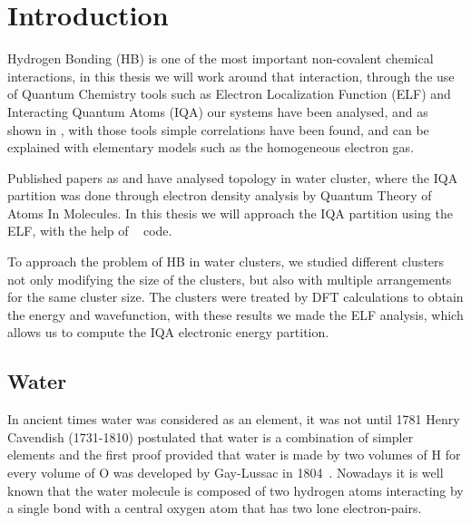 \chapter{Introduction}

Hydrogen Bonding (HB) is one of the most important non-covalent chemical
interactions, in this thesis we will work around that interaction, through the
use of Quantum Chemistry tools such as Electron Localization Function (ELF) and
Interacting Quantum Atoms (IQA) our systems have been analysed, and as shown
in \citet{Munrriz2019}, with those tools simple correlations have been found,
and can be explained with elementary models such as the homogeneous electron
gas.

Published papers as \citet{Toche2016} and \citet{Castor2020} have analysed
topology in water cluster, where the IQA partition was done through electron
density analysis by Quantum Theory of Atoms In Molecules. In this thesis we
will approach the IQA partition using the ELF, with the help of
{}~\cite{promolden} code.

To approach the problem of HB in water clusters, we studied different
clusters not only modifying the size of the clusters, but also with multiple
arrangements for the same cluster size. The clusters were treated by
DFT calculations to obtain the energy and wavefunction, with these
results we made the ELF analysis, which allows us to compute
the IQA electronic energy partition.

%

\newpage
%
\section{Water}

In ancient times water was considered as an element, it was not until 1781
Henry Cavendish (1731-1810) postulated that water is a combination of simpler
elements and the first proof provided that water is made by two volumes of H
for every volume of O was developed by Gay-Lussac in 1804~\cite{sanchez2006revolucion}.
Nowadays it is well known that the water molecule is composed of two hydrogen
atoms interacting by a single bond with a central oxygen atom that has two lone
electron-pairs.

